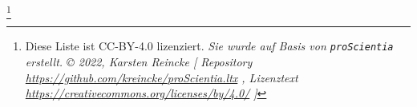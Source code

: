 
\footnote{Diese Liste ist CC-BY-4.0 lizenziert.
\textit{Sie wurde auf Basis von \texttt{proScientia} erstellt. \copyright{} 2022, Karsten Reincke [
Repository \href{https://github.com/kreincke/proScientia.ltx}{https://github.com/kreincke/proScientia.ltx} ,
Lizenztext \href{https://creativecommons.org/licenses/by/4.0/}{https://creativecommons.org/licenses/by/4.0/} ]
}}
